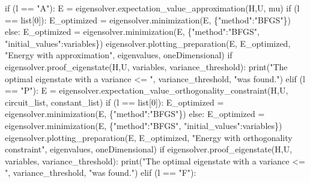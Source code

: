 \documentclass[
  letterpaper,
  DIV=11,
  numbers=noendperiod]{scrartcl}
\newenvironment{Shaded}{\begin{snugshade}}{\end{snugshade}}
\newcommand{\BuiltInTok}[1]{\textcolor[rgb]{0.00,0.23,0.31}{#1}}
\newcommand{\ControlFlowTok}[1]{\textcolor[rgb]{0.00,0.23,0.31}{#1}}
\newcommand{\DecValTok}[1]{\textcolor[rgb]{0.68,0.00,0.00}{#1}}
\newcommand{\NormalTok}[1]{\textcolor[rgb]{0.00,0.23,0.31}{#1}}
\newcommand{\OperatorTok}[1]{\textcolor[rgb]{0.37,0.37,0.37}{#1}}
\newcommand{\StringTok}[1]{\textcolor[rgb]{0.13,0.47,0.30}{#1}}
\begin{document}
\begin{Shaded}
\begin{Highlighting}[]
            \ControlFlowTok{if}\NormalTok{ (l }\OperatorTok{==} \StringTok{"A"}\NormalTok{):}
\NormalTok{                E }\OperatorTok{=}\NormalTok{ eigensolver.expectation\_value\_approximation(H,U, mu)}
                \ControlFlowTok{if}\NormalTok{ (l }\OperatorTok{==} \BuiltInTok{list}\NormalTok{[}\DecValTok{0}\NormalTok{]):}
\NormalTok{                    E\_optimized }\OperatorTok{=}\NormalTok{ eigensolver.minimization(E, \{}\StringTok{"method"}\NormalTok{:}\StringTok{"BFGS"}\NormalTok{\})}
                \ControlFlowTok{else}\NormalTok{: }
\NormalTok{                    E\_optimized }\OperatorTok{=}\NormalTok{ eigensolver.minimization(E, \{}\StringTok{"method"}\NormalTok{:}\StringTok{"BFGS"}\NormalTok{, }\StringTok{"initial\_values"}\NormalTok{:variables\})}
\NormalTok{                eigensolver.plotting\_preparation(E, E\_optimized, }\StringTok{"Energy with approximation"}\NormalTok{, eigenvalues, oneDimensional)}
                \ControlFlowTok{if}\NormalTok{ eigensolver.proof\_eigenstate(H,U, variables, variance\_threshold):}
                        \BuiltInTok{print}\NormalTok{(}\StringTok{"The optimal eigenstate with a variance \textless{}= "}\NormalTok{, variance\_threshold, }\StringTok{"was found."}\NormalTok{)}
            \ControlFlowTok{elif}\NormalTok{ (l }\OperatorTok{==} \StringTok{"P"}\NormalTok{):}
\NormalTok{                E }\OperatorTok{=}\NormalTok{ eigensolver.expectation\_value\_orthogonality\_constraint(H,U, circuit\_list, constant\_list)}
                \ControlFlowTok{if}\NormalTok{ (l }\OperatorTok{==} \BuiltInTok{list}\NormalTok{[}\DecValTok{0}\NormalTok{]):}
\NormalTok{                    E\_optimized }\OperatorTok{=}\NormalTok{ eigensolver.minimization(E, \{}\StringTok{"method"}\NormalTok{:}\StringTok{"BFGS"}\NormalTok{\})}
                \ControlFlowTok{else}\NormalTok{: }
\NormalTok{                    E\_optimized }\OperatorTok{=}\NormalTok{ eigensolver.minimization(E, \{}\StringTok{"method"}\NormalTok{:}\StringTok{"BFGS"}\NormalTok{, }\StringTok{"initial\_values"}\NormalTok{:variables\})}
\NormalTok{                eigensolver.plotting\_preparation(E, E\_optimized, }\StringTok{"Energy with orthogonality constraint"}\NormalTok{, eigenvalues, oneDimensional)}
                \ControlFlowTok{if}\NormalTok{ eigensolver.proof\_eigenstate(H,U, variables, variance\_threshold):}
                        \BuiltInTok{print}\NormalTok{(}\StringTok{"The optimal eigenstate with a variance \textless{}= "}\NormalTok{, variance\_threshold, }\StringTok{"was found."}\NormalTok{)}
            \ControlFlowTok{elif}\NormalTok{ (l }\OperatorTok{==} \StringTok{"F"}\NormalTok{):}

\end{Highlighting}
\end{Shaded}
\end{document}
